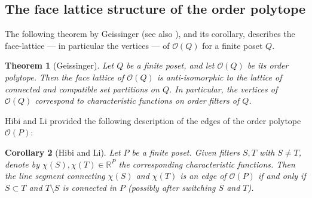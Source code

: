 \documentclass[11pt,a4paper,abstract=yes]{scrartcl}
\theoremstyle{plain}
\newtheorem{theorem}{Theorem}[section]
\newtheorem{corollary}[theorem]{Corollary}
\newcommand{\RR}{\mathbb{R}}
\newcommand{\orderpolytope}[1]{\mathcal{O}({#1})}
\begin{document}
\subsection{The face lattice structure of the order polytope}
\label{sec:orgf1b747c}
The following theorem by Geissinger \autocite{geissingerpolytope} (see also \autocite{StanleyTwoPosetPolytopes}),
and its corollary, describes the face-lattice --- in particular the vertices --- of \(\orderpolytope{Q}\) for
a finite poset \(Q\).

\begin{theorem}[Geissinger]
Let \(Q\) be a finite poset, and let \(\orderpolytope{Q}\) be its order polytope. Then the face lattice
of \(\orderpolytope{Q}\) is anti-isomorphic to the lattice of connected and compatible set partitions on \(Q\).
In particular, the vertices of \(\orderpolytope{Q}\) correspond to characteristic functions on order filters of \(Q\).
\label{thm-geissinger}
\end{theorem}

Hibi and Li \autocite{HibiCutting}\autocite{HibiEdgesOrderpolytope} provided the following description
of the edges of the order polytope \(\orderpolytope{P}\):
\begin{corollary}[Hibi and Li]
Let \(P\) be a finite poset.
Given filters \(S,T\) with \(S \neq T\), denote by \(\chi(S), \chi(T) \in \RR^{P}\) the corresponding characteristic functions.
Then the line segment connecting \(\chi(S)\) and \(\chi(T)\) is an edge of \(\orderpolytope{P}\)
if and only if \(S \subset T\) and \(T \setminus S\) is connected in \(P\)
(possibly after switching \(S\) and \(T\)).
\end{corollary}
\end{document}
